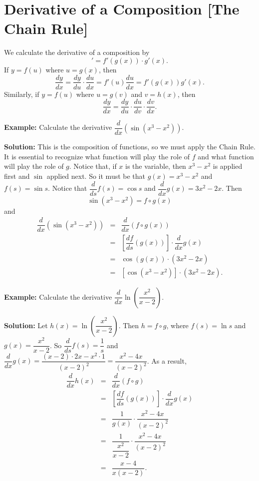 \documentclass[titlepage,a4paper,12pt]{report}
\begin{document}
\section{Derivative of a Composition [The Chain Rule]}
We calculate the derivative of a composition by 
\begin{equation*}
[f\circ g(x)]'=f'(g(x))\cdot g'(x).
\end{equation*}
If $y=f(u)$ where $u=g(x)$, then 
\begin{equation*}
\dfrac{dy}{dx}=\dfrac{dy}{du}\cdot \dfrac{du}{dx}=f'(u)\dfrac{du}{dx}=f'(g(x))g'(x).
\end{equation*}
Similarly, if $y=f(u)$ where $u=g(v)$ and $v=h(x)$, then 
\begin{equation*}
\dfrac{dy}{dx}=\dfrac{dy}{du}\cdot \dfrac{du}{dv}\cdot \dfrac{dv}{dx}.
\end{equation*}

\noindent \textbf{Example:} Calculate the derivative $\dfrac{d}{dx}(\sin (x^3-x^2))$.

\noindent \textbf{Solution:}  This is the composition of functions, so we must apply the Chain Rule.  It is essential to recognize what function will play the role of $f$ and what function will play the role of $g$. Notice that, if $x$  is the variable, then $x^3-x^2$ is applied first and $\sin$ applied next. So it must be that $g(x)=x^3-x^2$ and $f(s)=\sin s$. Notice that $\dfrac{d}{ds}f(s)=\cos s$ and $\dfrac{d}{dx}g(x)=3x^2-2x$. Then 
\begin{equation*}
\sin (x^3-x^2) =f\circ g(x)
\end{equation*}
and \begin{eqnarray*}
\dfrac{d}{dx}(\sin (x^3-x^2)) &=& \dfrac{d}{dx}(f\circ g(x))\\
&=& \left[\dfrac{df}{ds}(g(x)) \right]\cdot \dfrac{d}{dx}g(x)\\
&=& \cos (g(x)) \cdot (3x^2-2x)\\
&=& [\cos (x^3-x^2)]\cdot (3x^2-2x).
\end{eqnarray*}

\noindent \textbf{Example:} Calculate the derivative $\dfrac{d}{dx}\ln \left(\dfrac{x^2}{x-2}\right)$.

\noindent \textbf{Solution:} Let $h(x)=\ln \left(\dfrac{x^2}{x-2}\right)$. Then $h=f\circ g$, where $f(s)=\ln s$ and $g(x)=\dfrac{x^2}{x-2}$.  So $\dfrac{d}{ds}f(s)=\dfrac{1}{s}$ and $\dfrac{d}{dx} g(x)=\dfrac{(x-2)\cdot 2x-x^2\cdot 1}{(x-2)^2}=\dfrac{x^2-4x}{(x-2)^2}$. As a result, 
\begin{eqnarray*}
\dfrac{d}{dx}h(x) &=& \dfrac{d}{dx} (f\circ g)\\
&=& \left[\dfrac{df}{ds}(g(x)) \right]\cdot \dfrac{d}{dx}g(x)\\
&=& \dfrac{1}{g(x)}\cdot \dfrac{x^2-4x}{(x-2)^2}\\
&=& \dfrac{1}{\dfrac{x^2}{x-2}} \cdot \dfrac{x^2-4x}{(x-2)^2}\\
&=& \dfrac{x-4}{x(x-2)}.
\end{eqnarray*}
\end{document}
